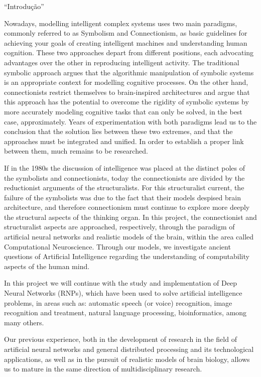 ``Introdu\c{c}\~{a}o''

Nowadays, modelling intelligent complex systems uses two main paradigms, commonly 
referred to as Symbolism and Connectionism, as basic guidelines for achieving your 
goals of creating intelligent machines and understanding human cognition. These 
two approaches depart from different positions, each advocating advantages over 
the other in reproducing intelligent activity. The traditional symbolic approach 
argues that the algorithmic manipulation of symbolic systems is an appropriate context 
for modelling cognitive processes. On the other hand, connectionists restrict themselves 
to brain-inspired architectures and argue that this approach has the potential to 
overcome the rigidity of symbolic systems by more accurately modeling cognitive tasks 
that can only be solved, in the best case, approximately. Years of experimentation 
with both paradigms lead us to the conclusion that the solution lies between these 
two extremes, and that the approaches must be integrated and unified. In order to 
establish a proper link between them, much remains to be researched.

If in the 1980s the discussion of intelligence was placed at the distinct poles 
of the symbolists and connectionists, today the connectionists are divided by the 
reductionist arguments of the structuralists. For this structuralist current, the 
failure of the symbolists was due to the fact that their models despised brain architecture, 
and therefore connectionism must continue to explore more deeply the structural aspects 
of the thinking organ. In this project, the connectionist and structuralist aspects 
are approached, respectively, through the paradigm of artificial neural networks 
and realistic models of the brain, within the area called Computational Neuroscience. 
Through our models, we investigate ancient questions of Artificial Intelligence regarding 
the understanding of computability aspects of the human mind.

In this project we will continue with the study and implementation of Deep Neural 
Networks (RNPs), which have been used to solve artificial intelligence problems, 
in areas such as: automatic speech (or voice) recognition, image recognition and 
treatment, natural language processing, bioinformatics, among many others.

Our previous experience, both in the development of research in the field of artificial 
neural networks and general distributed processing and its technological applications, 
as well as in the pursuit of realistic models of brain biology, allows us to mature 
in the same direction of multidisciplinary research.


